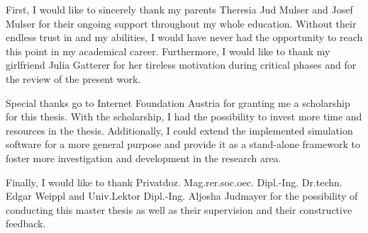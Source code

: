 First, I would like to sincerely thank my parents Theresia Jud Mulser and Josef Mulser for their ongoing support throughout my whole education. Without their endless trust in and my abilities, I would have never had the opportunity to reach this point in my academical career. Furthermore, I would like to thank my girlfriend Julia Gatterer for her tireless motivation during critical phases and for the review of the present work.

\bigskip

Special thanks go to Internet Foundation Austria for granting me a scholarship for this thesis. With the scholarship, I had the possibility to invest more time and resources in the thesis. Additionally, I could extend the implemented simulation software for a more general purpose and provide it as a stand-alone framework to foster more investigation and development in the research area.

Finally, I would like to thank Privatdoz. Mag.rer.soc.oec. Dipl.-Ing. Dr.techn. Edgar Weippl and Univ.Lektor Dipl.-Ing. Aljosha Judmayer for the possibility of conducting this master thesis as well as their supervision and their constructive feedback.
